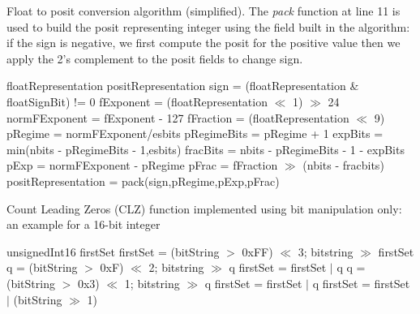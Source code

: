 \begin{algorithm}
 \caption{Float to posit conversion algorithm (simplified). The \textit{pack} function at line 11 is used to build the posit representing integer using the field built in the algorithm: if the sign is negative, we first compute the posit for the positive value then we apply the 2's complement to the posit fields to change sign.}
 \label{alg:positenc}
 \begin{algorithmic}[1]
 \renewcommand{\algorithmicrequire}{\textbf{Input:}}
 \renewcommand{\algorithmicensure}{\textbf{Output:}}
 \Require floatRepresentation
 \Ensure positRepresentation
\State sign = (floatRepresentation \& floatSignBit) != 0
\State fExponent = (floatRepresentation $\ll$ 1) $\gg$ 24
\State normFExponent = fExponent - 127
\State fFraction = (floatRepresentation $\ll$ 9) 
\State pRegime = normFExponent/esbits
\State pRegimeBits = pRegime + 1
\State expBits = min(nbits - pRegimeBits - 1,esbits)
\State fracBits = nbits - pRegimeBits - 1 - expBits
\State pExp = normFExponent - pRegime 
\State pFrac = fFraction $\gg$ (nbits - fracbits)
\State positRepresentation = pack(sign,pRegime,pExp,pFrac)
\end{algorithmic} 
\end{algorithm}

\begin{algorithm}
 \caption{ Count Leading Zeros (CLZ) function implemented using bit manipulation only: an example for a 16-bit integer}
 \label{alg:clz}
 \begin{algorithmic}[1]
   \renewcommand{\algorithmicrequire}{\textbf{Input:}}
 \renewcommand{\algorithmicensure}{\textbf{Output:}}
 \Require unsignedInt16
 \Ensure firstSet
  \State firstSet = (bitString $>$ 0xFF) $\ll$ 3; bitstring $\gg$ firstSet
  \State q = (bitString $>$ 0xF) $\ll$ 2; bitstring $\gg$ q
  \State firstSet = firstSet $|$ q
  \State q = (bitString $>$ 0x3) $\ll$ 1; bitstring $\gg$ q
  \State firstSet = firstSet $|$ q
  \State firstSet = firstSet $|$ (bitString $\gg$ 1)
 \end{algorithmic}
\end{algorithm}


